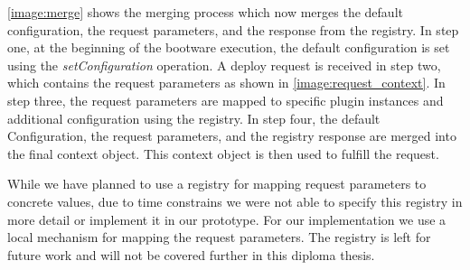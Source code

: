 \autoref{image:merge} shows the merging process which now merges the default configuration, the request parameters, and the response from the registry.
In step one, at the beginning of the bootware execution, the default configuration is set using the \textit{setConfiguration} operation.
A deploy request is received in step two, which contains the request parameters as shown in \autoref{image:request_context}.
In step three, the request parameters are mapped to specific plugin instances and additional configuration using the registry.
In step four, the default Configuration, the request parameters, and the registry response are merged into the final context object.
This context object is then used to fulfill the request.

While we have planned to use a registry for mapping request parameters to concrete values, due to time constrains we were not able to specify this registry in more detail or implement it in our prototype.
For our implementation we use a local mechanism for mapping the request parameters.
The registry is left for future work and will not be covered further in this diploma thesis.
